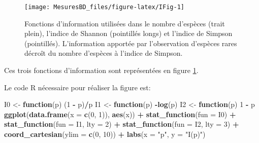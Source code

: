 \documentclass[
  11pt,
  french,
  a4paper,
  extrafontsizes,onecolumn,openright
  ]{memoir}
\newenvironment{Shaded}{\begin{snugshade}}{\end{snugshade}}
\newcommand{\AttributeTok}[1]{\textcolor[rgb]{0.13,0.29,0.53}{#1}}
\newcommand{\ControlFlowTok}[1]{\textcolor[rgb]{0.13,0.29,0.53}{\textbf{#1}}}
\newcommand{\DecValTok}[1]{\textcolor[rgb]{0.00,0.00,0.81}{#1}}
\newcommand{\FunctionTok}[1]{\textcolor[rgb]{0.13,0.29,0.53}{\textbf{#1}}}
\newcommand{\NormalTok}[1]{#1}
\newcommand{\OtherTok}[1]{\textcolor[rgb]{0.56,0.35,0.01}{#1}}
\newcommand{\SpecialCharTok}[1]{\textcolor[rgb]{0.81,0.36,0.00}{\textbf{#1}}}
\newcommand{\StringTok}[1]{\textcolor[rgb]{0.31,0.60,0.02}{#1}}
\begin{document}
\scriptsize

\begin{figure}

{\centering \texttt{[image: MesuresBD\_files/figure-latex/IFig-1]} 

}

\caption{Fonctions d'information utilisées dans le nombre d'espèces (trait plein), l'indice de Shannon (pointillés longs) et l'indice de Simpson (pointillés). L'information apportée par l'observation d'espèces rares décroît du nombre d'espèces à l'indice de Simpson.}\label{fig:IFig}
\end{figure}

\normalsize

Ces trois fonctions d'information sont représentées en figure \ref{fig:IFig}.

Le code R nécessaire pour réaliser la figure est:

\scriptsize

\begin{Shaded}
\begin{Highlighting}[]
\NormalTok{I0 }\OtherTok{\textless{}{-}} \ControlFlowTok{function}\NormalTok{(p) (}\DecValTok{1} \SpecialCharTok{{-}}\NormalTok{ p)}\SpecialCharTok{/}\NormalTok{p}
\NormalTok{I1 }\OtherTok{\textless{}{-}} \ControlFlowTok{function}\NormalTok{(p) }\SpecialCharTok{{-}}\FunctionTok{log}\NormalTok{(p)}
\NormalTok{I2 }\OtherTok{\textless{}{-}} \ControlFlowTok{function}\NormalTok{(p) }\DecValTok{1} \SpecialCharTok{{-}}\NormalTok{ p}
\FunctionTok{ggplot}\NormalTok{(}\FunctionTok{data.frame}\NormalTok{(}\AttributeTok{x =} \FunctionTok{c}\NormalTok{(}\DecValTok{0}\NormalTok{, }\DecValTok{1}\NormalTok{)), }\FunctionTok{aes}\NormalTok{(x)) }\SpecialCharTok{+} \FunctionTok{stat\_function}\NormalTok{(}\AttributeTok{fun =}\NormalTok{ I0) }\SpecialCharTok{+}
    \FunctionTok{stat\_function}\NormalTok{(}\AttributeTok{fun =}\NormalTok{ I1, }\AttributeTok{lty =} \DecValTok{2}\NormalTok{) }\SpecialCharTok{+} \FunctionTok{stat\_function}\NormalTok{(}\AttributeTok{fun =}\NormalTok{ I2,}
    \AttributeTok{lty =} \DecValTok{3}\NormalTok{) }\SpecialCharTok{+} \FunctionTok{coord\_cartesian}\NormalTok{(}\AttributeTok{ylim =} \FunctionTok{c}\NormalTok{(}\DecValTok{0}\NormalTok{, }\DecValTok{10}\NormalTok{)) }\SpecialCharTok{+} \FunctionTok{labs}\NormalTok{(}\AttributeTok{x =} \StringTok{"p"}\NormalTok{,}
    \AttributeTok{y =} \StringTok{"I(p)"}\NormalTok{)}
\end{Highlighting}
\end{Shaded}
\end{document}
